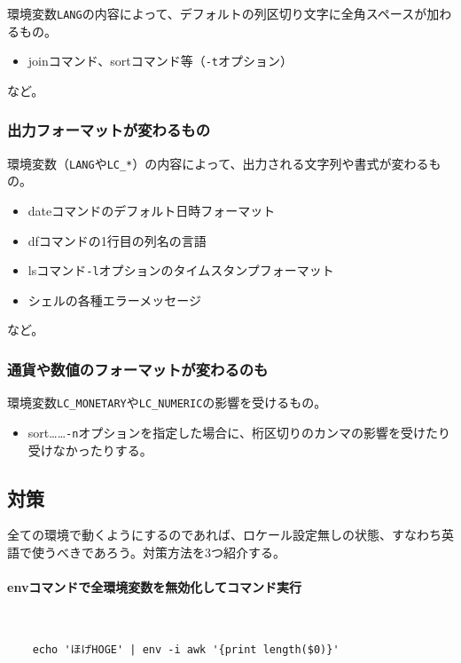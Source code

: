 環境変数\verb|LANG|の内容によって、デフォルトの列区切り文字に全角スペースが加わるもの。

\begin{itemize}
  \item joinコマンド、sortコマンド等（\verb|-t|オプション）
\end{itemize}

\noindent
など。

\subsubsection*{出力フォーマットが変わるもの}

環境変数（\verb|LANG|や\verb|LC_*|）の内容によって、出力される文字列や書式が変わるもの。

\begin{itemize}
  \item dateコマンドのデフォルト日時フォーマット
  \item dfコマンドの1行目の列名の言語
  \item lsコマンド\verb|-l|オプションのタイムスタンプフォーマット
  \item シェルの各種エラーメッセージ
\end{itemize}

\noindent
など。

\subsubsection*{通貨や数値のフォーマットが変わるのも}

環境変数\verb|LC_MONETARY|や\verb|LC_NUMERIC|の影響を受けるもの。

\begin{itemize}
  \item sort……\verb|-n|オプションを指定した場合に、桁区切りのカンマの影響を受けたり受けなかったりする。
\end{itemize}

\subsection*{対策}

全ての環境で動くようにするのであれば、ロケール設定無しの状態、すなわち英語で使うべきであろう。対策方法を3つ紹介する。

\paragraph{envコマンドで全環境変数を無効化してコマンド実行} 　\\
\begin{frameboxit}{160.0mm}
\begin{verbatim}
	echo 'ほげHOGE' | env -i awk '{print length($0)}'
\end{verbatim}
\end{frameboxit}

